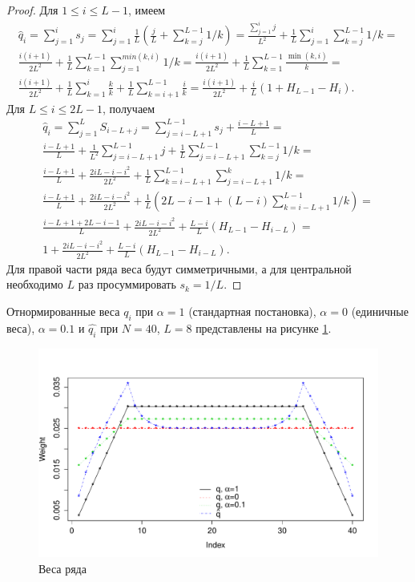 \documentclass[12pt,a4paper,fleqn,leqno]{article}
\begin{document}
\begin{proof}
Для $1 \le i \le L-1$, имеем
\begin{gather*}
\hat{q}_i = \sum_{j=1}^i s_j = \sum_{j=1}^i \frac{1}{L}(\frac{j}{L} + \sum_{k=j}^{L-1}1/k) = \frac{\sum_{j=1}^i j}{L^2} + \frac{1}{L}\sum_{j=1}^i \sum_{k=j}^{L-1} 1/k =\\
\frac{i(i+1)}{2L^2}+\frac{1}{L} \sum_{k = 1}^{L-1} \sum_{j=1}^{min(k,i)} 1/k = \frac{i(i+1)}{2L^2}+\frac{1}{L} \sum_{k = 1}^{L-1} \frac{\min(k,i)}{k} = \\
\frac{i(i+1)}{2L^2}+\frac{1}{L} \sum_{k = 1}^{i} \frac{k}{k}+\frac{1}{L} \sum_{k = i+1}^{L-1} \frac{i}{k} = \frac{i(i+1)}{2 L^2} + \frac{i}{L}(1 + H_{L-1} - H_i).
\end{gather*}
Для $L \le i \le 2L-1$, получаем
\begin{gather*}
\hat{q}_i = \sum_{j = 1}^L S_{i-L+j} = \sum_{j = i - L + 1}^{L - 1} s_j + \frac{i - L + 1}{L} =\\ 
\frac{i - L + 1}{L} + \frac{1}{L^2} \sum_{j = i - L + 1}^{L-1}j + \frac{1}{L} \sum_{j = i-L + 1}^{L-1} \sum_{k=j}^{L-1}1/k =\\ \frac{i - L + 1}{L} + \frac{2iL - i - i^2}{2L^2} + \frac{1}{L} \sum_{k = i - L + 1}^{L - 1} \sum_{j = i - L + 1}^k 1/k =\\ \frac{i - L + 1}{L} + \frac{2iL - i - i^2}{2L^2} + \frac{1}{L}(2L - i - 1 + (L - i)\sum_{k = i - L + 1}^{L-1}1/k)=\\
\frac{i - L + 1 + 2L - i - 1}{L} + \frac{2iL - i - i^2}{2L^2} + \frac{L - i}{L}(H_{L - 1} - H_{i-L}) = \\
1 + \frac{2iL-i-i^2}{2L^2} + \frac{L-i}{L}(H_{L-1} - H_{i - L}).
\end{gather*}
Для правой части ряда веса будут симметричными, а для центральной необходимо $L$ раз просуммировать $s_k = 1/L$.
\end{proof}
Отнормированные веса $q_i$ при $\alpha = 1$ (стандартная постановка), $\alpha = 0$ (единичные веса), $\alpha = 0.1$ и $\hat{q_i}$ при $N = 40$, $L = 8$ представлены на рисунке \ref{img_weights}.
\begin{figure}[!h] \begin{center}
\includegraphics[width = 15cm]{weights.pdf}\caption{Веса ряда}\label{img_weights}
\end{center}\end{figure}
\end{document}
